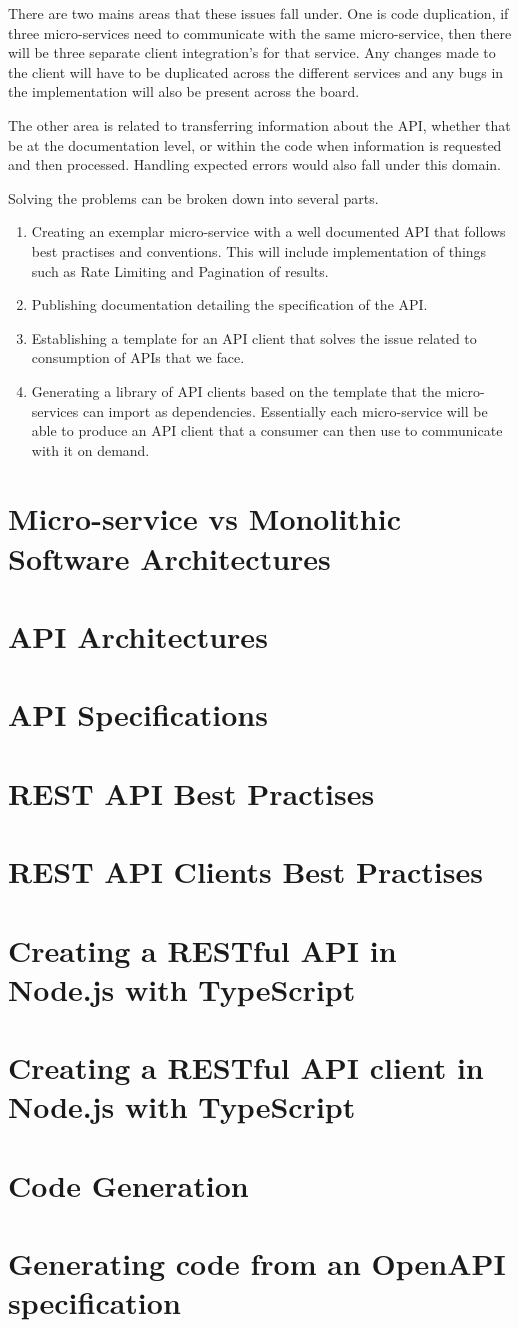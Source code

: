 There are two mains areas that these issues fall under. One is code duplication, if three micro-services need to communicate with the same micro-service, then there will  be three separate client integration's for that service. Any changes made to the client will have to be duplicated across the different services and any bugs in the implementation will also be present across the board. 

The other area is related to transferring information about the API, whether that be at the documentation level, or within the code when information is requested and then processed. Handling expected errors would also fall under this domain.

Solving the problems can be broken down into several parts.
 \begin{enumerate}
   \item Creating an exemplar micro-service with a well documented API that follows best practises and conventions. This will include implementation of things such as Rate Limiting and Pagination of results.
   \item Publishing documentation detailing the specification of the API.
   \item Establishing a template for an API client that solves the issue related to consumption of APIs that we face.
   \item Generating a library of API clients based on the template that the micro-services can import as dependencies. Essentially each micro-service will be able to produce an API client that a consumer can then use to communicate with it on demand.
 \end{enumerate}


\section{Micro-service vs Monolithic Software Architectures}
\section{API Architectures}
\section{API Specifications}
\section{REST API Best Practises}
\section{REST API Clients Best Practises}
\section{Creating a RESTful API in Node.js with TypeScript}
\section{Creating a RESTful API client in Node.js with TypeScript}
\section{Code Generation}
\section{Generating code from an OpenAPI specification}
